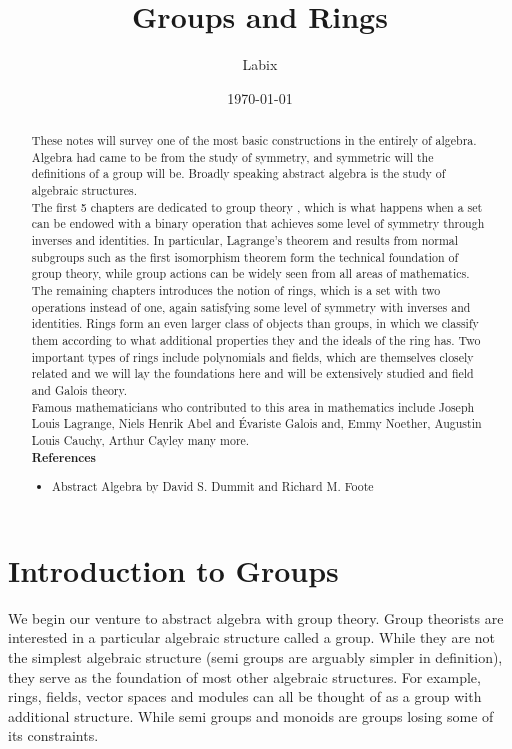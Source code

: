 \documentclass[a4paper]{article}
\title{Groups and Rings}
\author{Labix}
\date{\today}
\begin{document}
\maketitle
\begin{abstract}
These notes will survey one of the most basic constructions in the entirely of algebra. Algebra had came to be from the study of symmetry, and symmetric will the definitions of a group will be. Broadly speaking abstract algebra is the study of algebraic structures. \\

The first 5 chapters are dedicated to group theory , which is what happens when a set can be endowed with a binary operation that achieves some level of symmetry through inverses and identities. In particular, Lagrange's theorem and results from normal subgroups such as the first isomorphism theorem form the technical foundation of group theory, while group actions can be widely seen from all areas of mathematics. \\

The remaining chapters introduces the notion of rings, which is a set with two operations instead of one, again satisfying some level of symmetry with inverses and identities. Rings form an even larger class of objects than groups, in which we classify them according to what additional properties they and the ideals of the ring has. Two important types of rings include polynomials and fields, which are themselves closely related and we will lay the foundations here and will be extensively studied and field and Galois theory. \\

Famous mathematicians who contributed to this area in mathematics include Joseph Louis Lagrange, Niels Henrik Abel and Évariste Galois and, Emmy Noether, Augustin Louis Cauchy, Arthur Cayley many more. \\
\textbf{References}
\begin{itemize}
\item Abstract Algebra by David S. Dummit and Richard M. Foote
\end{itemize}
\end{abstract}
\pagebreak
\tableofcontents
\pagebreak

\section{Introduction to Groups}
We begin our venture to abstract algebra with group theory. Group theorists are interested in a particular algebraic structure called a group. While they are not the simplest algebraic structure (semi groups are arguably simpler in definition), they serve as the foundation of most other algebraic structures. For example, rings, fields, vector spaces and modules can all be thought of as a group with additional structure. While semi groups and monoids are groups losing some of its constraints. 
\end{document}
